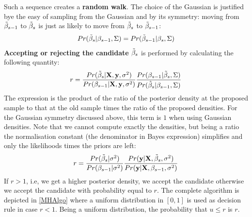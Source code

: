 Such a sequence creates a \textbf{random walk}. The choice of the Gaussian is justified bye the easy of sampling from the Gaussian and by its symmetry: moving from $\tilde{\mathbf{\beta}}_{s-1}$ to $\tilde{\mathbf{\beta}}_s$ is just as likely to move from $\tilde{\mathbf{\beta}}_s$ to $\tilde{\mathbf{\beta}}_{s-1}$:
\begin{equation}
Pr(\tilde{\mathbf{\beta}}_s|\mathbf{\beta}_{s-1}, \Sigma)  = Pr(\tilde{\mathbf{\beta}}_{s-1}|\mathbf{\beta}_{s}, \Sigma) 
\end{equation}
\textbf{Accepting or rejecting the candidate $\tilde{\mathbf{\beta}}_s$} is performed by calculating the following quantity:
\begin{equation}
r = \frac{Pr(\tilde{\mathbf{\beta}}_s|\mathrm{\mathbf{X}}, \mathbf{y}, \sigma^2)}{Pr(\mathbf{\beta}_{s-1}|\mathrm{\mathbf{X}}, \mathbf{y}, \sigma^2)}\frac{Pr(\mathbf{\beta}_{s-1}|\tilde{\mathbf{\beta}}_s, \Sigma)}{Pr(\hat{\mathbf{\beta}}_{s}|\mathbf{\beta}_{s-1}, \Sigma)}
\end{equation}
The expression is the product of the ratio of the posterior density at the proposed sample to that at the old sample times the ratio of the proposed densities. For the Gaussian symmetry discussed above, this term is $1$ when using Gaussian densities. Note that we cannot compute exactly the densities, but being a ratio the normalisation constant (the denominator in Bayes expression) simplifies and only the likelihoods times the priors are left:
\begin{equation}
r = \frac{Pr(\tilde{\mathbf{\beta}}_s|\sigma^2)}{Pr(\mathbf{\beta}_{s-1}| \sigma^2)} \frac{Pr(\mathbf{y}|\mathrm{\mathbf{X}}, \tilde{\mathbf{\beta}}_s, \sigma^2)}{Pr(\mathbf{y}|\mathrm{\mathbf{X}}, \mathbf{\beta}_{s-1}, \sigma^2)}
\end{equation}
If $r>1$, i.e, we get a higher posterior density, we accept the candidate otherwise we accept the candidate with probability equal to $r$. The complete algorithm is depicted in \autoref{MHAlgo} where a uniform distribution in $[0,1]$ is used as decision rule in case $r<1$. Being a uniform distribution, the probability that $u \le r$ is $r$.

